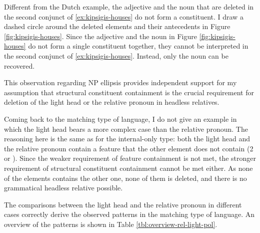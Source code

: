 Different from the Dutch example, the adjective and the noun that are deleted in the second conjunct of \ref{ex:kipsigis-houses} do not form a constituent. I draw a dashed circle around the deleted elements and their antecedents in Figure \ref{fig:kipsigis-houses}. Since the adjective and the noun in Figure \ref{fig:kipsigis-houses} do not form a single constituent together, they cannot be interpreted in the second conjunct of \ref{ex:kipsigis-houses}. Instead, only the noun can be recovered.

This observation regarding NP ellipsis provides independent support for my assumption that structural constituent containment is the crucial requirement for deletion of the light head or the relative pronoun in headless relatives.

Coming back to the matching type of language, I do not give an example in which the light head bears a more complex case than the relative pronoun. The reasoning here is the same as for the internal-only type: both the light head and the relative pronoun contain a feature that the other element does not contain (2 or ). Since the weaker requirement of feature containment is not met, the stronger requirement of structural constituent containment cannot be met either. As none of the elements contains the other one, none of them is deleted, and there is no grammatical headless relative possible.

The comparisons between the light head and the relative pronoun in different cases correctly derive the observed patterns in the matching type of language. An overview of the patterns is shown in Table \ref{tbl:overview-rel-light-pol}.

